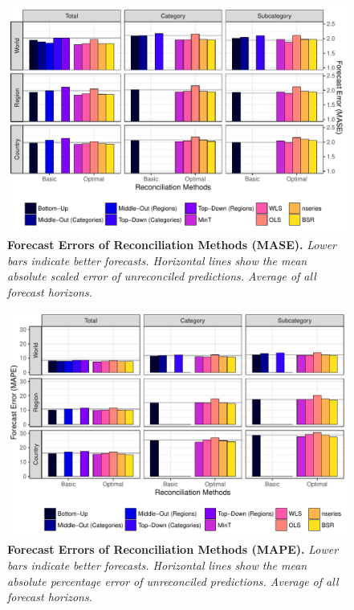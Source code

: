 \begin{figure}[H]
	\includegraphics[width=\textwidth]{fig/fig_eval_mase}
	\caption[Forecast Errors of Reconciliation Methods]{\textbf{Forecast Errors of Reconciliation Methods (MASE).} \textit{Lower bars indicate better forecasts. Horizontal lines show the mean absolute scaled error of unreconciled predictions. Average of all forecast horizons.}}\label{fig:mase}
\end{figure}

\begin{figure}[H]
	\includegraphics[width=\textwidth]{fig/fig_eval_mape}
	\caption[Forecast Errors of Reconciliation Methods]{\textbf{Forecast Errors of Reconciliation Methods (MAPE).} \textit{Lower bars indicate better forecasts. Horizontal lines show the mean absolute percentage error of unreconciled predictions. Average of all forecast horizons.}}\label{fig:mape}
\end{figure}




